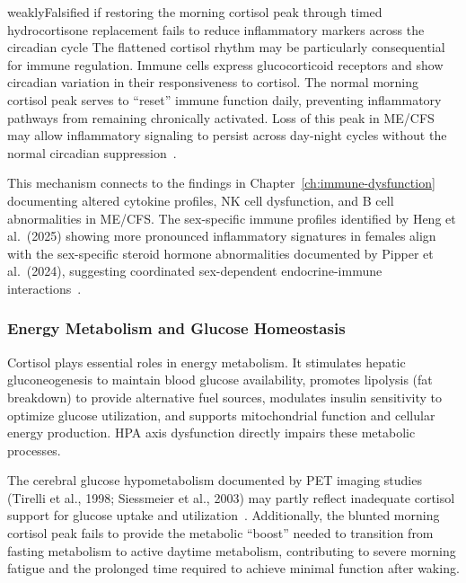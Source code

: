 \begin{fhypothesis}{weakly}{Falsified if restoring the morning cortisol peak through timed hydrocortisone replacement fails to reduce inflammatory markers across the circadian cycle}
\label{hyp:diurnal-immune}
The flattened cortisol rhythm may be particularly consequential for immune regulation. Immune cells express glucocorticoid receptors and show circadian variation in their responsiveness to cortisol. The normal morning cortisol peak serves to ``reset'' immune function daily, preventing inflammatory pathways from remaining chronically activated. Loss of this peak in ME/CFS may allow inflammatory signaling to persist across day-night cycles without the normal circadian suppression~\cite{cambras2018circadian}.
\end{fhypothesis}

This mechanism connects to the findings in Chapter~\ref{ch:immune-dysfunction} documenting altered cytokine profiles, NK cell dysfunction, and B cell abnormalities in ME/CFS. The sex-specific immune profiles identified by Heng et al.\ (2025) showing more pronounced inflammatory signatures in females align with the sex-specific steroid hormone abnormalities documented by Pipper et al.\ (2024), suggesting coordinated sex-dependent endocrine-immune interactions~\cite{heng2025sexspecific,pipper2024steroid}.

\subsubsection{Energy Metabolism and Glucose Homeostasis}

Cortisol plays essential roles in energy metabolism. It stimulates hepatic gluconeogenesis to maintain blood glucose availability, promotes lipolysis (fat breakdown) to provide alternative fuel sources, modulates insulin sensitivity to optimize glucose utilization, and supports mitochondrial function and cellular energy production. HPA axis dysfunction directly impairs these metabolic processes.

The cerebral glucose hypometabolism documented by PET imaging studies (Tirelli et al., 1998; Siessmeier et al., 2003) may partly reflect inadequate cortisol support for glucose uptake and utilization~\cite{tirelli1998pet,siessmeier2003pet}. Additionally, the blunted morning cortisol peak fails to provide the metabolic ``boost'' needed to transition from fasting metabolism to active daytime metabolism, contributing to severe morning fatigue and the prolonged time required to achieve minimal function after waking.

